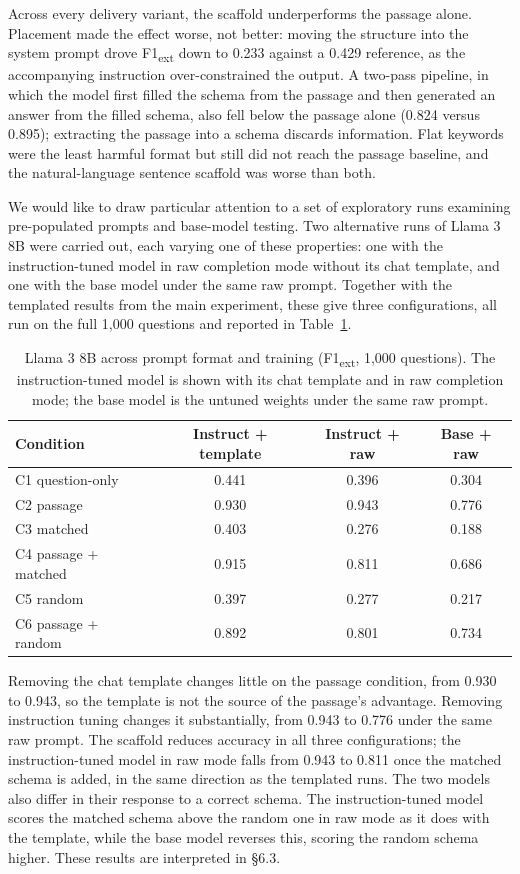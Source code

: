 \documentclass{article}
\begin{document}
Across every delivery variant, the scaffold underperforms the passage alone. Placement made the effect worse, not better: moving the structure into the system prompt drove F1\textsubscript{ext} down to 0.233 against a 0.429 reference, as the accompanying instruction over-constrained the output. A two-pass pipeline, in which the model first filled the schema from the passage and then generated an answer from the filled schema, also fell below the passage alone (0.824 versus 0.895); extracting the passage into a schema discards information. Flat keywords were the least harmful format but still did not reach the passage baseline, and the natural-language sentence scaffold was worse than both.

We would like to draw particular attention to a set of exploratory runs examining pre-populated prompts and base-model testing. Two alternative runs of Llama 3 8B were carried out, each varying one of these properties: one with the instruction-tuned model in raw completion mode without its chat template, and one with the base model under the same raw prompt. Together with the templated results from the main experiment, these give three configurations, all run on the full 1,000 questions and reported in Table~\ref{tab:rawtuning}.

\begin{table}[h]
\centering
\begin{tabular}{lccc}
\toprule
Condition & Instruct + template & Instruct + raw & Base + raw \\
\midrule
C1 question-only    & 0.441 & 0.396 & 0.304 \\
C2 passage          & 0.930 & 0.943 & 0.776 \\
C3 matched          & 0.403 & 0.276 & 0.188 \\
C4 passage + matched & 0.915 & 0.811 & 0.686 \\
C5 random           & 0.397 & 0.277 & 0.217 \\
C6 passage + random & 0.892 & 0.801 & 0.734 \\
\bottomrule
\end{tabular}
\caption{Llama 3 8B across prompt format and training (F1\textsubscript{ext}, 1,000 questions). The instruction-tuned model is shown with its chat template and in raw completion mode; the base model is the untuned weights under the same raw prompt.}
\label{tab:rawtuning}
\end{table}

Removing the chat template changes little on the passage condition, from 0.930 to 0.943, so the template is not the source of the passage's advantage. Removing instruction tuning changes it substantially, from 0.943 to 0.776 under the same raw prompt. The scaffold reduces accuracy in all three configurations; the instruction-tuned model in raw mode falls from 0.943 to 0.811 once the matched schema is added, in the same direction as the templated runs. The two models also differ in their response to a correct schema. The instruction-tuned model scores the matched schema above the random one in raw mode as it does with the template, while the base model reverses this, scoring the random schema higher. These results are interpreted in \S6.3.
\end{document}
